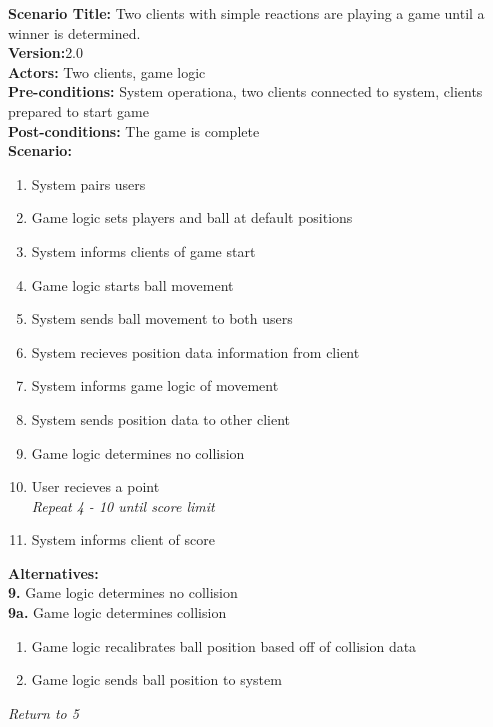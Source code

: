 \documentclass[letterpaper,12pt]{article}
\begin{document}
\noindent \textbf{Scenario Title:} Two clients with simple reactions are playing a game until a winner is determined. \\
\textbf{Version:}2.0\\
\textbf{Actors:} Two clients, game logic\\
\textbf{Pre-conditions:} System operationa, two clients connected to system, clients prepared to start game\\
\textbf{Post-conditions:} The game is complete\\
\textbf{Scenario:}
\begin{enumerate}
\item System pairs users
\item Game logic sets players and ball at default positions
\item System informs clients of game start
\item Game logic starts ball movement
\item System sends ball movement to both users
\item System recieves position data information from client
\item System informs game logic of movement
\item System sends position data to other client
\item Game logic determines no collision
\item User recieves a point\\ 
 \emph{Repeat 4 - 10 until score limit}
\item System informs client of score
\end{enumerate}
\textbf{Alternatives:}\\
\textbf{9.} Game logic determines no collision\\
\textbf{9a.} Game logic determines collision
\begin{enumerate}
\item Game logic recalibrates ball position based off of collision data
\item Game logic sends ball position to system
\end{enumerate}
\emph{Return to 5}\\


\end{document}
